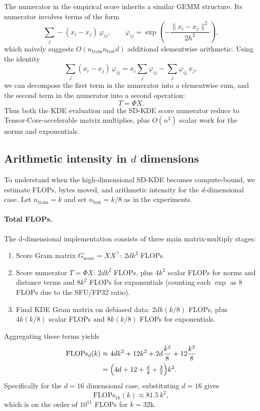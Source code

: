 The numerator in the empirical score inherits a similar GEMM structure.  Its numerator
involves terms of the form
\[
  \sum_j -(x_i - x_j)\,\varphi_{ij},
  \qquad
  \varphi_{ij}
  = \exp\!\left(-\frac{\lVert x_i - x_j\rVert^2}{2h^2}\right),
\]
which naively suggests $O(n_{\text{train}} n_{\text{test}} d)$ additional
elementwise arithmetic.  Using the identity
\[
  \sum_j (x_i - x_j)\,\varphi_{ij}
  =
  x_i \sum_j \varphi_{ij}
  -
  \sum_j \varphi_{ij}\,x_j,
\]
we can decompose the first term in the numerator into a elementwise sum, and the second term in the numerator into a second  operation:
\[
  T
  =
  \Phi X.
\]
Thus both the KDE evaluation and the SD-KDE score numerator reduce to
Tensor-Core-accelerable matrix multiplies, plus $O(n^2)$ scalar work for the
norms and exponentials.

\subsection{Arithmetic intensity in $d$ dimensions}

To understand when the high-dimensional SD-KDE becomes compute-bound, we
estimate FLOPs, bytes moved, and arithmetic intensity for the $d$-dimensional
case.  Let $n_{\text{train}} = k$ and set $n_{\text{test}} = k/8$ as in the
experiments.

\paragraph{Total FLOPs.}
The d-dimensional implementation consists of three main matrix-multiply stages:
\begin{enumerate}
  \item Score Gram matrix $G_{\text{score}} = X X^\top$:
        $2 d k^2$ FLOPs.
  \item Score numerator $T = \Phi X$:
        $2 d k^2$ FLOPs, plus $4 k^2$ scalar FLOPs for norms and distance
        terms and $8 k^2$ FLOPs for exponentials (counting each $\exp$ as
        $8$ FLOPs due to the SFU/FP32 ratio).
  \item Final KDE Gram matrix on debiased data:
        $2 d k (k/8)$ FLOPs, plus $4 k (k/8)$ scalar FLOPs and
        $8 k (k/8)$ FLOPs for exponentials.
\end{enumerate}
Aggregating these terms yields
\[
  \begin{aligned}
    \text{FLOPs}_d(k)
    &\approx
    4 d k^2 + 12 k^2 + 2 d \frac{k^2}{8} + 12 \frac{k^2}{8} \\
    &=
    \Bigl(4 d + 12 + \tfrac{d}{4} + \tfrac{3}{2}\Bigr) k^2.
  \end{aligned}
\]
Specifically for the $d=16$ dimensional case, substituting $d=16$ gives
\[
  \text{FLOPs}_{16}(k)
  \approx
  81.5\,k^2,
\]
which is on the order of $10^{11}$ FLOPs for $k=32\text{k}$.


